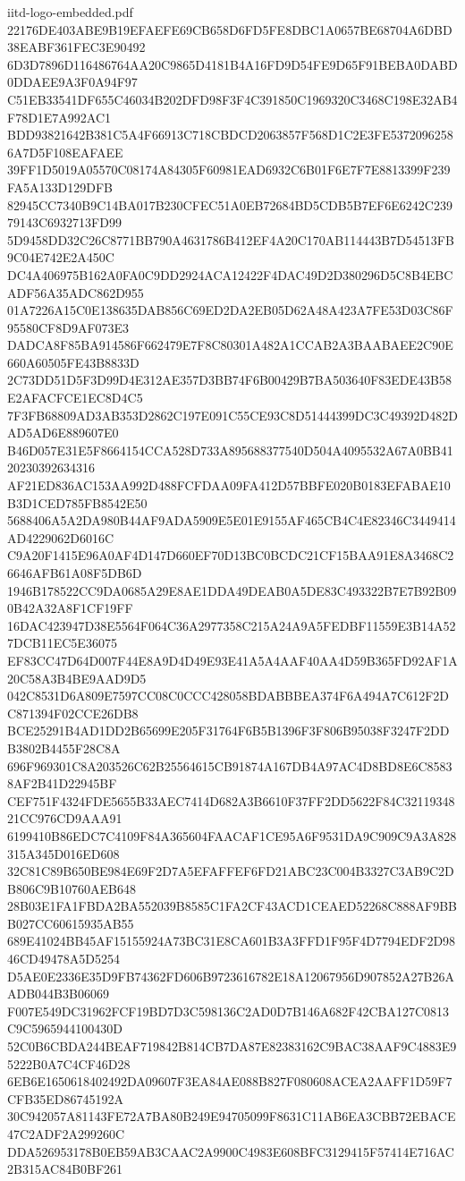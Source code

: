 \begin{filecontents*}[overwrite]{iitd-logo-embedded.pdf}
22176DE403ABE9B19EFAEFE69CB658D6FD5FE8DBC1A0657BE68704A6DBD38EABF361FEC3E90492
6D3D7896D116486764AA20C9865D4181B4A16FD9D54FE9D65F91BEBA0DABD0DDAEE9A3F0A94F97
C51EB33541DF655C46034B202DFD98F3F4C391850C1969320C3468C198E32AB4F78D1E7A992AC1
BDD93821642B381C5A4F66913C718CBDCD2063857F568D1C2E3FE53720962586A7D5F108EAFAEE
39FF1D5019A05570C08174A84305F60981EAD6932C6B01F6E7F7E8813399F239FA5A133D129DFB
82945CC7340B9C14BA017B230CFEC51A0EB72684BD5CDB5B7EF6E6242C23979143C6932713FD99
5D9458DD32C26C8771BB790A4631786B412EF4A20C170AB114443B7D54513FB9C04E742E2A450C
DC4A406975B162A0FA0C9DD2924ACA12422F4DAC49D2D380296D5C8B4EBCADF56A35ADC862D955
01A7226A15C0E138635DAB856C69ED2DA2EB05D62A48A423A7FE53D03C86F95580CF8D9AF073E3
DADCA8F85BA914586F662479E7F8C80301A482A1CCAB2A3BAABAEE2C90E660A60505FE43B8833D
2C73DD51D5F3D99D4E312AE357D3BB74F6B00429B7BA503640F83EDE43B58E2AFACFCE1EC8D4C5
7F3FB68809AD3AB353D2862C197E091C55CE93C8D51444399DC3C49392D482DAD5AD6E889607E0
B46D057E31E5F8664154CCA528D733A895688377540D504A4095532A67A0BB4120230392634316
AF21ED836AC153AA992D488FCFDAA09FA412D57BBFE020B0183EFABAE10B3D1CED785FB8542E50
5688406A5A2DA980B44AF9ADA5909E5E01E9155AF465CB4C4E82346C3449414AD4229062D6016C
C9A20F1415E96A0AF4D147D660EF70D13BC0BCDC21CF15BAA91E8A3468C26646AFB61A08F5DB6D
1946B178522CC9DA0685A29E8AE1DDA49DEAB0A5DE83C493322B7E7B92B090B42A32A8F1CF19FF
16DAC423947D38E5564F064C36A2977358C215A24A9A5FEDBF11559E3B14A527DCB11EC5E36075
EF83CC47D64D007F44E8A9D4D49E93E41A5A4AAF40AA4D59B365FD92AF1A20C58A3B4BE9AAD9D5
042C8531D6A809E7597CC08C0CCC428058BDABBBEA374F6A494A7C612F2DC871394F02CCE26DB8
BCE25291B4AD1DD2B65699E205F31764F6B5B1396F3F806B95038F3247F2DDB3802B4455F28C8A
696F969301C8A203526C62B25564615CB91874A167DB4A97AC4D8BD8E6C85838AF2B41D22945BF
CEF751F4324FDE5655B33AEC7414D682A3B6610F37FF2DD5622F84C3211934821CC976CD9AAA91
6199410B86EDC7C4109F84A365604FAACAF1CE95A6F9531DA9C909C9A3A828315A345D016ED608
32C81C89B650BE984E69F2D7A5EFAFFEF6FD21ABC23C004B3327C3AB9C2DB806C9B10760AEB648
28B03E1FA1FBDA2BA552039B8585C1FA2CF43ACD1CEAED52268C888AF9BBB027CC60615935AB55
689E41024BB45AF15155924A73BC31E8CA601B3A3FFD1F95F4D7794EDF2D9846CD49478A5D5254
D5AE0E2336E35D9FB74362FD606B9723616782E18A12067956D907852A27B26AADB044B3B06069
F007E549DC31962FCF19BD7D3C598136C2AD0D7B146A682F42CBA127C0813C9C5965944100430D
52C0B6CBDA244BEAF719842B814CB7DA87E82383162C9BAC38AAF9C4883E95222B0A7C4CF46D28
6EB6E1650618402492DA09607F3EA84AE088B827F080608ACEA2AAFF1D59F7CFB35ED86745192A
30C942057A81143FE72A7BA80B249E94705099F8631C11AB6EA3CBB72EBACE47C2ADF2A299260C
DDA526953178B0EB59AB3CAAC2A9900C4983E608BFC3129415F57414E716AC2B315AC84B0BF261

\end{filecontents*}
